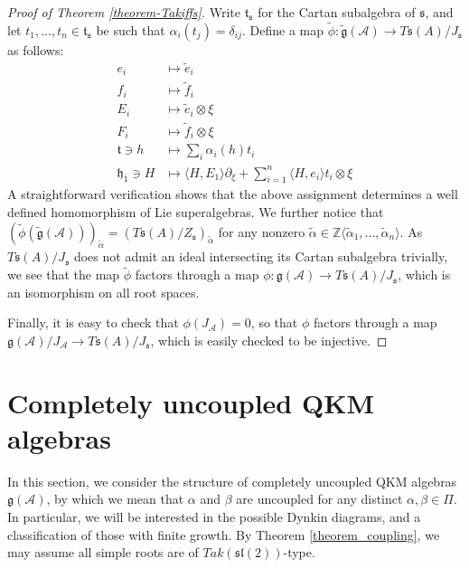 \documentclass[12pt, a4paper, reqno]{amsart}
\def\h{\mathfrak{h}}
\def\l{\mathfrak{l}}
\def\s{\mathfrak{s}}
\def\ol{\overline}
\theoremstyle{definition}
\theoremstyle{definition}
\theoremstyle{definition}
\numberwithin{theorem}{section}
\numberwithin{lemma}{section}
\numberwithin{remark}{section}
\numberwithin{definition}{section}
\numberwithin{corollary}{section}
\numberwithin{proposition}{section}
\numberwithin{example}{section}
\begin{document}
\begin{proof}[Proof of Theorem \ref{theorem-Takiffs}]
		Write $\mathfrak{t}_{\s}$ for the Cartan subalgebra of $\s$, and let $t_1,\dots,t_n\in\mathfrak{t}_{\s}$ be such that $\alpha_i(t_j)=\delta_{ij}$.  Define a map \(\tilde{\phi} : \tilde{\mathfrak{g}}(\mathcal{A})\rightarrow T\mathfrak{s}(A)/J_\mathfrak{s}\) as follows:
		\begin{align*}
			e_i & \mapsto \tilde{e}_i \\
			f_i & \mapsto \tilde{f}_i \\
			E_i & \mapsto \tilde{e}_i\otimes \xi\\
			F_i & \mapsto \tilde{f}_i\otimes \xi \\
			\mathfrak{t}\ni h& \mapsto \sum\limits_{i}\alpha_i(h)t_i \\
			\h_{\ol{1}}\ni H & \mapsto \langle H,E_1 \rangle\partial_\xi + \sum_{i=1}^n \langle H,e_i \rangle t_i\otimes\xi
		\end{align*}
		A straightforward verification shows that the above assignment determines a well defined homomorphism of Lie superalgebras. We further notice that \((\tilde{\phi}(\tilde{\mathfrak{g}}(\mathcal{A})))_{\tilde{\alpha}} = (T\mathfrak{s}(A)/Z_\mathfrak{s})_{\tilde{\alpha}}\) for any nonzero  \(\tilde{\alpha} \in \mathbb{Z}\langle \tilde{\alpha}_1,...,\tilde{\alpha}_n \rangle\). As \(T\mathfrak{s}(A)/J_\mathfrak{s}\) does not admit an ideal intersecting its Cartan subalgebra trivially, we see that the map \(\tilde{\phi}\) factors through a map \(\phi : \mathfrak{g}(\mathcal{A}) \rightarrow T\mathfrak{s}(A)/J_\mathfrak{s}\), which is an isomorphism on all root spaces. \par
		Finally, it is easy to check that \(\phi(J_\mathcal{A}) = 0\), so that \(\phi\) factors through a map \newline \(\mathfrak{g}(\mathcal{A})/J_{\mathcal{A}}\rightarrow T\mathfrak{s}(A)/J_\mathfrak{s}\), which is easily checked to be injective.
	\end{proof}
	
	
	
	
	
	\section{Completely uncoupled QKM algebras}
	
	In this section, we consider the structure of completely uncoupled QKM algebras \(\mathfrak{g}(\mathcal{A})\), by which we mean that \(\alpha\) and \(\beta\) are uncoupled for any distinct \(\alpha,\beta\in \Pi\).   In particular, we will be interested in the possible Dynkin diagrams, and a classification of those with finite growth.  By Theorem \ref{theorem_coupling}, we may assume all simple roots are of $Tak(\s\l(2))$-type. 	
	
\end{document}
